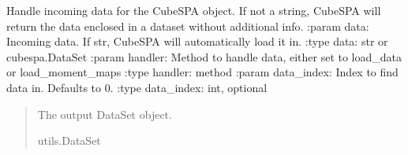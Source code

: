 \documentclass[letterpaper,10pt,english]{sphinxmanual}
\begin{document}

\begin{fulllineitems}
\label{\detokenize{modules:cubespa.data.handle_data}}
\pysigstartsignatures
{}
\pysigstopsignatures
\sphinxAtStartPar
Handle incoming data for the CubeSPA object.
If not a string, CubeSPA will return the data enclosed in a dataset without additional info.
:param data: Incoming data. If str, CubeSPA will automatically load it in.
:type data: str or cubespa.DataSet
:param handler: Method to handle data, either set to load\_data or load\_moment\_maps
:type handler: method
:param data\_index: Index to find data in. Defaults to 0.
:type data\_index: int, optional
\begin{quote}\begin{description}
\sphinxAtStartPar
The output DataSet object.

\sphinxAtStartPar
utils.DataSet

\end{description}\end{quote}

\end{fulllineitems}


\begin{fulllineitems}
\label{\detokenize{modules:cubespa.data.load_data}}
\pysigstartsignatures
{}
\pysigstopsignatures
\end{fulllineitems}


\begin{fulllineitems}
\label{\detokenize{modules:cubespa.data.load_moment_maps}}
\pysigstartsignatures
{}
\pysigstopsignatures
\end{fulllineitems}
\end{document}

